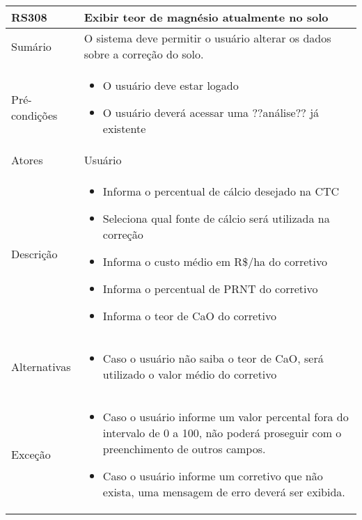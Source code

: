 \begin{quadro}[!htb]
    \begin{tabular}{|p{3cm}|p{11cm}|}
        \hline
        \textbf{RS308} & \textbf{Exibir teor de magnésio atualmente no solo} \\
        \hline
        Sumário        & O sistema deve permitir o usuário alterar os dados sobre a correção do solo.                  \\
        \hline
        Pré-condições  & \begin{itemize}
            \item O usuário deve estar logado
            \item O usuário deverá acessar uma ??análise?? já existente 
        \end{itemize}                 \\
        \hline
        Atores         & Usuário                  \\
        \hline
        Descrição      &
        \begin{itemize}
            \item Informa o percentual de cálcio desejado na CTC
            \item Seleciona qual fonte de cálcio será utilizada na correção
            \item Informa o custo médio em R\$/ha do corretivo
            \item Informa o percentual de PRNT do corretivo
            \item Informa o teor de CaO do corretivo
        \end{itemize}                 \\
        \hline
        Alternativas   &
        \begin{itemize}
            \item Caso o usuário não saiba o teor de CaO, será utilizado o valor médio do corretivo
        \end{itemize}                 \\
        \hline
        Exceção        &
        \begin{itemize}
            \item Caso o usuário informe um valor percental fora do intervalo de 0 a 100, não poderá proseguir com o preenchimento de outros campos.
            \item Caso o usuário informe um corretivo que não exista, uma mensagem de erro deverá ser exibida.
        \end{itemize}                   \\
        \hline
    \end{tabular}
\end{quadro}

